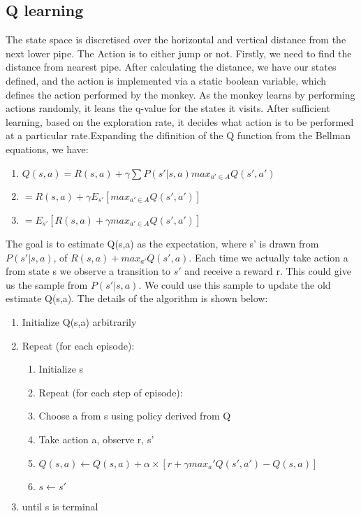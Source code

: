 \documentclass[11pt]{article}
\theoremstyle{definition}
\begin{document}
\subsection{\textbf{Q learning}}
The state space is discretised over the horizontal and vertical distance from the next lower pipe. The Action is to either jump or not. Firstly, we need to find the distance from nearest pipe. After calculating the distance, we have our states defined, and the action is implemented via a static boolean variable, which defines the action performed by the monkey. As the monkey learns by performing actions randomly, it leans the q-value for the states it visits. After sufficient learning, based on the exploration rate, it decides what action is to be performed at a particular rate.Expanding the difinition of the Q function from the Bellman equations, we have: 
\begin{enumerate}
\item[]	$Q(s,a) = R(s,a)+\gamma\sum P(s'|s,a) max_{a'\in A}Q(s',a')$
\item []   $= R(s,a)+\gamma E_{s'}[max_{a'\in A}Q(s',a')]$
\item []   $=E_{s'}[R(s,a)+\gamma max_{a'\in A}Q(s',a')]$
\end{enumerate}
The goal is to estimate Q(s,a) as the expectation, where s' is drawn from $P(s'|s,a)$, of $R(s,a)+max_{a'}Q(s',a)$. Each time we actually take action a from state s we observe a transition to $s'$ and receive a reward r. This could give us the sample from  $P(s'|s,a)$. We could use this sample to update the old estimate Q(s,a). The details of the algorithm is shown below:                                           
\begin{enumerate}
\item [] Initialize Q(s,a) arbitrarily
\item [] Repeat (for each episode):
	\begin{enumerate}
		\item [] Initialize s
		\item [] Repeat (for each step of episode):
		\item [] Choose a from s using policy derived from Q
		\item [] Take action a, observe r, s'
		\item [] $Q(s,a)\leftarrow Q(s,a)+\alpha \times [r+\gamma  max_a'Q(s',a')-Q(s,a)]$
		\item []$s\leftarrow s'$
	\end{enumerate}
\item []  until s is terminal
\end{enumerate}
\end{document}
